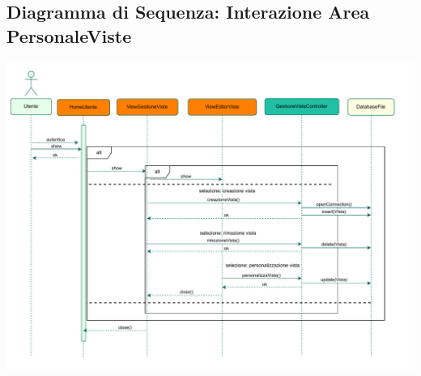 \subsection*{Diagramma di Sequenza: Interazione Area Personale\-Viste}
{}
\begin{adjustwidth}{-2.5cm}{0cm}
\includegraphics[scale=0.8]{progettazione/Diagramma-Sequenza-Interazione-Viste.drawio.pdf}
\end{adjustwidth}
\vspace{0.5cm}


